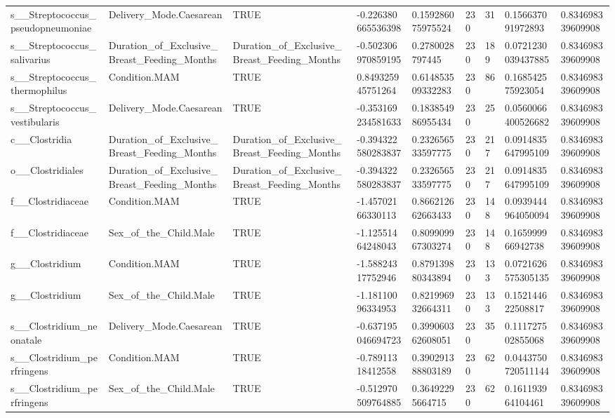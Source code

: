 \begin{longtable}{lllllllll}
s\_\_Streptococcus\_pseudopneumoniae & Delivery\_Mode.Caesarean & TRUE & -0.226380665536398 & 0.159286075975524 & 230 & 31 & 0.156637091972893 & 0.834698339609908 \\
s\_\_Streptococcus\_salivarius & Duration\_of\_Exclusive\_Breast\_Feeding\_Months & Duration\_of\_Exclusive\_Breast\_Feeding\_Months & -0.502306970859195 & 0.2780028797445 & 230 & 189 & 0.0721230039437885 & 0.834698339609908 \\
s\_\_Streptococcus\_thermophilus & Condition.MAM & TRUE & 0.849325945751264 & 0.614853509332283 & 230 & 86 & 0.168542575923054 & 0.834698339609908 \\
s\_\_Streptococcus\_vestibularis & Delivery\_Mode.Caesarean & TRUE & -0.353169234581633 & 0.183854986955434 & 230 & 25 & 0.0560066400526682 & 0.834698339609908 \\
c\_\_Clostridia & Duration\_of\_Exclusive\_Breast\_Feeding\_Months & Duration\_of\_Exclusive\_Breast\_Feeding\_Months & -0.394322580283837 & 0.232656533597775 & 230 & 217 & 0.0914835647995109 & 0.834698339609908 \\
o\_\_Clostridiales & Duration\_of\_Exclusive\_Breast\_Feeding\_Months & Duration\_of\_Exclusive\_Breast\_Feeding\_Months & -0.394322580283837 & 0.232656533597775 & 230 & 217 & 0.0914835647995109 & 0.834698339609908 \\
f\_\_Clostridiaceae & Condition.MAM & TRUE & -1.45702166330113 & 0.866212662663433 & 230 & 148 & 0.0939444964050094 & 0.834698339609908 \\
f\_\_Clostridiaceae & Sex\_of\_the\_Child.Male & TRUE & -1.12551464248043 & 0.809909967303274 & 230 & 148 & 0.165999966942738 & 0.834698339609908 \\
g\_\_Clostridium & Condition.MAM & TRUE & -1.58824317752946 & 0.879139880343894 & 230 & 133 & 0.0721626575305135 & 0.834698339609908 \\
g\_\_Clostridium & Sex\_of\_the\_Child.Male & TRUE & -1.18110096334953 & 0.821996932664311 & 230 & 133 & 0.152144622508817 & 0.834698339609908 \\
s\_\_Clostridium\_neonatale & Delivery\_Mode.Caesarean & TRUE & -0.637195046694723 & 0.399060362608051 & 230 & 35 & 0.111727502855068 & 0.834698339609908 \\
s\_\_Clostridium\_perfringens & Condition.MAM & TRUE & -0.78911318412558 & 0.390291388803189 & 230 & 62 & 0.0443750720511144 & 0.834698339609908 \\
s\_\_Clostridium\_perfringens & Sex\_of\_the\_Child.Male & TRUE & -0.512970509764885 & 0.36492295664715 & 230 & 62 & 0.161193964104461 & 0.834698339609908 \\

\end{longtable}
